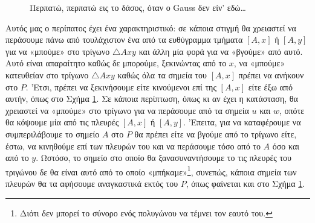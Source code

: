\documentclass[11pt,a4paper]{article}
\theoremstyle{definition}
\begin{document}
	\begin{figure}[!htb]
		\centering
		\caption{Περπατώ, περπατώ εις το δάσος, όταν ο Gauss δεν είν' εδώ\ldots}
		\label{fig:11}
	\end{figure}

	Αυτός μας ο περίπατος έχει ένα χαρακτηριστικό: σε κάποια στιγμή θα χρειαστεί να περάσουμε πάνω από τουλάχιστον ένα από τα ευθύγραμμα τμήματα $[A,x]$ ή $[A,y]$ για να «μπούμε» στο τρίγωνο $\triangle Axy$ και άλλη μία φορά για να «βγούμε» από αυτό. Αυτό είναι απαραίτητο καθώς δε μπορούμε, ξεκινώντας από το $x$, να «μπούμε» κατευθείαν στο τρίγωνο $\triangle Axy$ καθώς όλα τα σημεία του $[A,x]$ πρέπει να ανήκουν στο $P$. 'Ετσι, πρέπει να ξεκινήσουμε είτε κινούμενοι επί της $[A,x]$ είτε έξω από αυτήν, όπως στο Σχήμα \ref{fig:11}. Σε κάποια περίπτωση, όπως κι αν έχει η κατάσταση, θα χρειαστεί να «μπούμε» στο τρίγωνο για να περάσουμε από τα σημεία $u$ και $w$, οπότε θα κόψουμε μία από τις πλευρές $[A,x]$ ή $[A,y]$. 'Επειτα, για να καταφέρουμε να συμπεριλάβουμε το σημείο $A$ στο $P$ θα πρέπει είτε να βγούμε από το τρίγωνο είτε, έστω, να κινηθούμε επί των πλευρών του και να περάσουμε τόσο από το $A$ όσο και από το $y$. Ωστόσο, το σημείο στο οποίο θα ξανασυναντήσουμε το τις πλευρές του τριγώνου δε θα είναι αυτό από το οποίο «μπήκαμε»\footnote{Διότι δεν μπορεί το σύνορο ενός πολυγώνου να τέμνει τον εαυτό του.}, συνεπώς, κάποια σημεία των πλευρών θα τα αφήσουμε αναγκαστικά εκτός του $P$, όπως φαίνεται και στο Σχήμα \ref{fig:11}.
	
\end{document}
